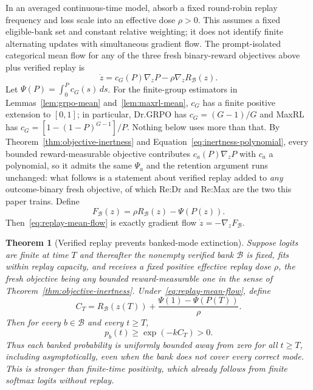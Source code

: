 \documentclass{article}
\newcommand{\1}{\mathbf 1}
\newtheorem{theorem}[lemma]{Theorem}
\theoremstyle{remark}
\theoremstyle{definition}
\theoremstyle{plain}
\begin{document}
In an averaged continuous-time model, absorb a fixed round-robin replay
frequency and loss scale into an effective dose $\rho>0$. This assumes a
fixed eligible-bank set and constant relative weighting; it does not identify
finite alternating updates with simultaneous gradient flow. The prompt-isolated categorical mean flow for any of the three fresh
binary-reward objectives above plus verified replay is
\begin{equation}
  \dot z
  =c_G(P)\nabla_zP-\rho\nabla_zR_{\mathcal B}(z).
  \label{eq:replay-mean-flow}
\end{equation}
Let $\Psi(P)=\int_0^P c_G(s)\,ds$. For the finite-group estimators in Lemmas~\ref{lem:grpo-mean}
and~\ref{lem:maxrl-mean}, $c_G$ has a finite positive extension to $[0,1]$;
in particular, Dr.GRPO has $c_G=(G-1)/G$ and MaxRL has
$c_G=[1-(1-P)^{G-1}]/P$. Nothing below uses more than that. By
Theorem~\ref{thm:objective-inertness} and
Equation~\eqref{eq:inertness-polynomial}, every bounded reward-measurable
objective contributes $c_a(P)\nabla_zP$ with $c_a$ a polynomial, so it admits
the same $\Psi_a$ and the retention argument runs unchanged: what follows is a
statement about verified replay added to \emph{any} outcome-binary fresh
objective, of which Re:Dr and Re:Max are the two this paper trains. Define
\begin{equation}
  F_{\mathcal B}(z)=\rho R_{\mathcal B}(z)-\Psi(P(z)).
  \label{eq:replay-potential}
\end{equation}
Then~\eqref{eq:replay-mean-flow} is exactly gradient flow
$\dot z=-\nabla_zF_{\mathcal B}$.

\begin{theorem}[Verified replay prevents banked-mode extinction]
\label{thm:replay-retention}
Suppose logits are finite at time $T$ and thereafter the nonempty verified
bank $\mathcal B$ is fixed, fits within replay capacity, and receives a
fixed positive effective replay dose $\rho$, the fresh objective being any
bounded reward-measurable one in the sense of
Theorem~\ref{thm:objective-inertness}. Under~\eqref{eq:replay-mean-flow}, define
\[
  C_T
  =R_{\mathcal B}(z(T))
   +\frac{\Psi(1)-\Psi(P(T))}{\rho}.
\]
Then for every $b\in\mathcal B$ and every $t\ge T$,
\begin{equation}
  p_b(t)\ge \exp(-kC_T)>0.
  \label{eq:replay-retention-bound}
\end{equation}
Thus each banked probability is uniformly bounded away from zero for all
$t\ge T$, including asymptotically, even when the bank does not cover every
correct mode. This is stronger than finite-time positivity, which already
follows from finite softmax logits without replay.
\end{theorem}
\end{document}
